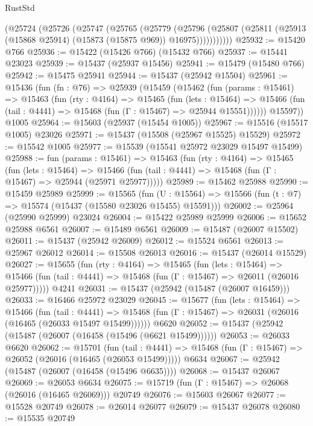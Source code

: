 \begin{lexlean}{RustStd}
\begin{coremodule}
        (@25724
          (@25726
            (@25747
              (@25765
                (@25779
                  (@25796
                    (@25807 (@25811 (@25913 (@15868 @25914) (@15873 (@15875 @969)) @16975)))))))))))
@25932 := @15420 @766
@25936 := @15422 (@15426 @766) (@15432 @766)
@25937 := @15441 @23023
@25939 := @15437 (@25937 @15456)
@25941 := @15479 (@15480 @766)
@25942 := @15475 @25941
@25944 := @15437 (@25942 @15504)
@25961 := @15436
    (fun (fn : @76) =>
    @25939
      (@15459
        (@15462
          (fun (params : @15461) =>
          @15463
            (fun (rty : @4164) =>
            @15465
              (fun (lets : @15464) =>
              @15466 (fun (tail : @4441) => @15468 (fun (Γ : @15467) => @25944 @15551))))))
        @15597))
    @1005
@25964 := @15603 (@25937 (@15454 @1005))
@25967 := @15516 (@15517 @1005) @23026
@25971 := @15437 (@15508 (@25967 @15525) @15529)
@25972 := @15542 @1005
@25977 := @15539 (@15541 @25972 @23029 @15497 @15499)
@25988 := fun (params : @15461) =>
  @15463
    (fun (rty : @4164) =>
    @15465
      (fun (lets : @15464) =>
      @15466 (fun (tail : @4441) => @15468 (fun (Γ : @15467) => @25944 (@25971 @25977)))))
@25989 := @15462 @25988
@25990 := @15459 @25989
@25999 := @15565
    (fun (U : @15564) => @15566 (fun (t : @7) => @15574 (@15437 (@15580 @23026 @15455) @15591)))
@26002 := @25964 (@25990 @25999) @23024
@26004 := @15422 @25989 @25999
@26006 := @15652 @25988 @6561
@26007 := @15489 @6561
@26009 := @15487 (@26007 @15502)
@26011 := @15437 (@25942 @26009)
@26012 := @15524 @6561
@26013 := @25967 @26012
@26014 := @15508 @26013
@26016 := @15437 (@26014 @15529)
@26027 := @15655
    (fun (rty : @4164) =>
    @15465
      (fun (lets : @15464) =>
      @15466 (fun (tail : @4441) => @15468 (fun (Γ : @15467) => @26011 (@26016 @25977)))))
    @4241
@26031 := @15437 (@25942 (@15487 (@26007 @16459)))
@26033 := @16466 @25972 @23029
@26045 := @15677
    (fun (lets : @15464) =>
    @15466
      (fun (tail : @4441) =>
      @15468 (fun (Γ : @15467) => @26031 (@26016 (@16465 (@26033 @15497 @15499))))))
    @6620
@26052 := @15437 (@25942 (@15487 (@26007 (@16458 (@15496 (@6621 @15499))))))
@26053 := @26033 @6620
@26062 := @15701
    (fun (tail : @4441) => @15468 (fun (Γ : @15467) => @26052 (@26016 (@16465 (@26053 @15499)))))
    @6634
@26067 := @25942 (@15487 (@26007 (@16458 (@15496 @6635))))
@26068 := @15437 @26067
@26069 := @26053 @6634
@26075 := @15719 (fun (Γ : @15467) => @26068 (@26016 (@16465 @26069))) @20749
@26076 := @15603 @26067
@26077 := @15528 @20749
@26078 := @26014 @26077
@26079 := @15437 @26078
@26080 := @15535 @20749

\end{coremodule}
\end{lexlean}
